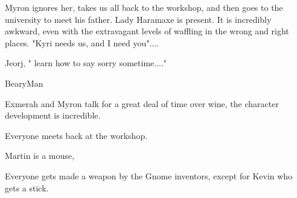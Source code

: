 Myron ignores her, takes us all back to the workshop, and then goes to the university to meet his father. Lady Haramaxe is present. It is incredibly awkward, even with the extravagant levels of waffling in the wrong and right places. "Kyri needs us, and I need you"....\medskip

Jeorj, " learn how to say sorry sometime...."\medskip

BearyMan\medskip

Exmerah and Myron talk for a great deal of time over wine, the character development is incredible.\medskip

Everyone meets back at the workshop.\medskip

Martin is a mouse,\medskip

Everyone gets made a weapon by the Gnome inventors, except for Kevin who gets a stick.\medskip

%

\clearpage
